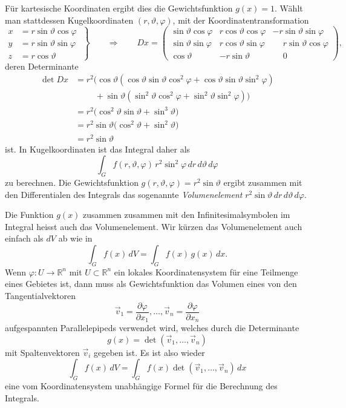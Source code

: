 Für kartesische Koordinaten ergibt dies die Gewichtsfunktion $g(x)=1$.
Wählt man stattdessen Kugelkoordinaten $(r,\vartheta,\varphi)$, mit der
Koordinatentransformation
\begin{equation}
\left.
\begin{aligned}
x&=r\sin\vartheta\cos\varphi\\
y&=r\sin\vartheta\sin\varphi\\
z&=r\cos\vartheta
\end{aligned}
\;\right\}
\qquad
\Rightarrow
\qquad
Dx
=
\begin{pmatrix}
\sin\vartheta\cos\varphi
	&  r \cos\vartheta\cos\varphi
		& -r\sin\vartheta\sin\varphi\\
\sin\vartheta\sin\varphi
	&  r \cos\vartheta\sin\varphi
		& \phantom{-}r\sin\vartheta\cos\varphi\\
\cos\vartheta
	& -r \sin\vartheta
		& \phantom{-}0
\end{pmatrix},
\end{equation}
deren Determinante
\begin{align*}
\det Dx
&=
r^2\bigl(
\cos\vartheta
(\cos\vartheta \sin\vartheta \cos^2\varphi
+
\cos\vartheta \sin\vartheta \sin^2\varphi
)
\\
&\phantom{=}
\quad
+
\sin\vartheta
(
\sin^2\vartheta \cos^2\varphi
+
\sin^2\vartheta \sin^2\varphi
)
\bigr)
\\
&=
r^2\bigl(
\cos^2\vartheta\sin\vartheta
+
\sin^3\vartheta
\bigr)
\\
&=
r^2
\sin\vartheta
\bigl(
\cos^2\vartheta
+
\sin^2\vartheta
\bigr)
\\
&=
r^2\sin\vartheta
\end{align*}
ist.
In Kugelkoordinaten ist das Integral daher als
\[
\int_G f(r,\vartheta,\varphi)
\,
r^2\sin^2\varphi
\,dr\,d\vartheta\,d\varphi
\]
zu berechnen.
Die Gewichtsfunktion $g(r,\vartheta,\varphi)=r^2\sin\vartheta$ ergibt
zusammen mit den Differentialen des Integrals das sogenannte
{\em Volumenelement}
\(
r^2\sin\vartheta\,dr\,d\vartheta\,d\varphi
\).

Die Funktion $g(x)$ zusammen zusammen mit den Infinitesimalsymbolen
im Integral heisst auch das Volumenelement.
%
Wir kürzen das Volumenelement auch einfach als $dV$ ab wie in
\[
\int_G f(x) \,dV
=
\int_G f(x)\,g(x)\,dx.
\]
Wenn $\varphi\colon U\to\mathbb{R}^n$ mit $U\subset\mathbb{R}^n$ ein lokales
Koordinatensystem für eine Teilmenge eines Gebietes ist, dann muss als
Gewichtsfunktion das Volumen eines von den Tangentialvektoren
\[
\vec{v}_1
=
\frac{\partial\varphi}{\partial x_1}
,\dots,
\vec{v}_n
=
\frac{\partial\varphi}{\partial x_n}
\]
aufgespannten Parallelepipeds verwendet wird, welches durch die Determinante
\[
g(x)
=
\det(\vec{v}_1,\dots,\vec{v}_n)
\]
mit Spaltenvektoren $\vec{v}_i$ gegeben ist.
Es ist also wieder
\[
\int_G f(x)\, dV
=
\int_G f(x) \det(\vec{v}_1,\dots,\vec{v}_n)\,dx
\]
eine vom Koordinatensystem unabhängige Formel für die Berechnung des
Integrals.

